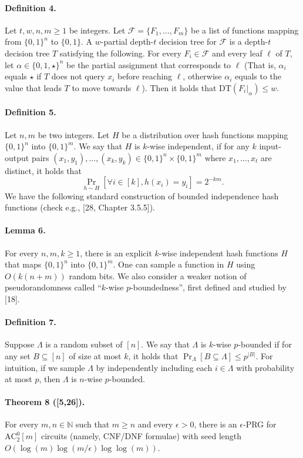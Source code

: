 \documentclass[10pt,a4paper]{article}
\begin{document}
\paragraph{Definition 4.} Let $t,w,n,m\ge1$ be integers. Let $\mathcal F=\{F_1,\ldots,F_m\}$ be a list of functions mapping from $\{0,1\}^n$ to $\{0,1\}$. A $w$-partial depth-$t$ decision tree for $\mathcal F$ is a depth-$t$ decision tree $T$ satisfying the following. For every $F_i\in\mathcal F$ and every leaf $\ell$ of $T$, let $\alpha\in\{0,1,\star\}^n$ be the partial assignment that corresponds to $\ell$ (That is, $\alpha_i$ equals $\star$ if $T$ does not query $x_i$ before reaching $\ell$, otherwise $\alpha_i$ equals to the value that leads $T$ to move towards $\ell$). Then it holds that $\mathrm{DT}(F_i|_\alpha)\le w$.
\paragraph{Definition 5.} Let $n,m$ be two integers. Let $H$ be a distribution over hash functions mapping $\{0,1\}^n$ into $\{0,1\}^m$. We say that $H$ is $k$-wise independent, if for any $k$ input-output pairs $(x_1,y_1),\ldots,(x_k,y_k)\in\{0,1\}^n\times\{0,1\}^m$ where $x_1,\ldots,x_t$ are distinct, it holds that
\[\Pr_{h\sim H}[\forall i\in[k],h(x_i)=y_i]=2^{-km}.\]
We have the following standard construction of bounded independence hash functions (check e.g., [28, Chapter 3.5.5]).
\paragraph{Lemma 6.} For every $n,m,k\ge1$, there is an explicit $k$-wise independent hash functions $H$ that maps $\{0,1\}^n$ into $\{0,1\}^m$. One can sample a function in $H$ using $O(k(n+m))$ random bits.
We also consider a weaker notion of pseudorandomness called ``$k$-wise $p$-boundedness'', first defined and studied by [18].
\paragraph{Definition 7.} Suppose $\Lambda$ is a random subset of $[n]$. We say that $\Lambda$ is $k$-wise $p$-bounded if for any set $B\subseteq[n]$ of size at most $k$, it holds that $\Pr_\Lambda[B\subseteq\Lambda]\le p^{|B|}$. For intuition, if we sample $\Lambda$ by independently including each $i\in\Lambda$ with probability at most $p$, then $\Lambda$ is $n$-wise $p$-bounded.
\paragraph{Theorem 8 ([5,26]).} For every $m,n\in\mathbb N$ such that $m\ge n$ and every $\epsilon>0$, there is an $\epsilon$-PRG for $\mathrm{AC}^0_2[m]$ circuits (namely, CNF/DNF formulae) with seed length $O(\log(m)\log(m/\epsilon)\log\log(m))$.
\end{document}
